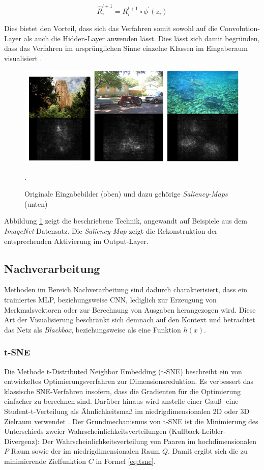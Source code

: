 \begin{equation}
\label{eq:simonyian}
\hat{R}^{l+1}_i = R^{l+1}_i \circ \phi^{'}(z_i)
\end{equation}

Dies bietet den Vorteil, dass sich das Verfahren somit sowohl auf die Convo\-lution-Layer als auch die Hidden-Layer anwenden lässt. Dies lässt sich damit begründen, dass das Verfahren im ursprünglichen Sinne einzelne Klassen im Eingaberaum visualisiert \cite[vgl.][]{Simonyan2013}.


\begin{figure}
\centering
\includegraphics[width=0.6\linewidth]{images/4_simonyan}
\caption[]{Originale Eingabebilder (oben) und dazu gehörige \textit{Saliency-Maps} (unten) \cite[siehe][]{Simonyan2013}}.
\label{fig:4_simonyan}
\end{figure}

Abbildung \ref{fig:4_simonyan} zeigt die beschriebene Technik, angewandt auf Beispiele aus dem \textit{ImageNet}-Datensatz. Die \textit{Saliency-Map} zeigt die Rekonstruktion der entsprechenden Aktivierung im Output-Layer. 

\subsection{Nachverarbeitung}
Methoden im Bereich Nachverarbeitung sind dadurch charakterisiert, dass ein trainiertes MLP, beziehungsweise CNN, lediglich zur Erzeugung von Merkmalsvektoren oder zur Berechnung von Ausgaben herangezogen wird. Diese Art der Visualisierung beschränkt sich demnach auf den Kontext und betrachtet das Netz als \textit{Blackbox}, beziehungsweise als eine Funktion $h(x)$.


\subsubsection{t-SNE}

Die Methode t-Distributed Neighbor Embedding (t-SNE) beschreibt ein von \cite{Laurens2008} entwickeltes Optimierungsverfahren zur Dimensionsreduktion. Es verbessert das klassische SNE-Verfahren insofern, dass die Gradienten für die Optimierung einfacher zu berechnen sind. Darüber hinaus wird anstelle einer Gauß- eine Student-t-Verteilung als Ähnlichkeitsmaß im niedrigdimensionalen 2D oder 3D Zielraum verwendet \cite[vgl.][]{Laurens2008}. Der Grundmechanismus von t-SNE ist die Minimierung des Unterschieds zweier Wahrscheinlichkeitsverteilungen (Kullback-Leibler-Divergenz): Der Wahrscheinlichkeitsverteilung von Paaren im hochdimensionalen $P$ Raum sowie der im niedrigdimensionalen Raum $Q$. Damit ergibt sich die zu minimierende Zielfunktion $C$ in Formel \ref{eq:tsne}.


